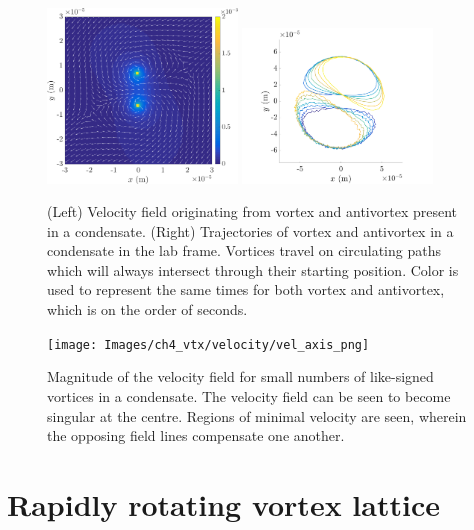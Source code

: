 \begin{figure}\centering
    \includegraphics[width=0.45\textwidth]{Images/ch4_vtx/vtx_anti_velfield}
    \includegraphics[width=0.45\textwidth]{Images/ch4_vtx/vtx_antivtx_traj}
    \caption{(Left) Velocity field originating from vortex and antivortex present in a condensate. (Right) Trajectories of vortex and antivortex in a condensate in the lab frame. Vortices travel on circulating paths which will always intersect through their starting position. Color is used to represent the same times for both vortex and antivortex, which is on the order of seconds.}
    \label{fig:vel_pm}
\end{figure}

\begin{figure}\centering
    \texttt{[image: Images/ch4\_vtx/velocity/vel\_axis\_png]}
    \caption{Magnitude of the velocity field for small numbers of like-signed vortices in a condensate. The velocity field can be seen to become singular at the centre. Regions of minimal velocity are seen, wherein the opposing field lines compensate one another.}
    \label{fig:vel_pm_contour}
\end{figure}


\section{Rapidly rotating vortex lattice}

